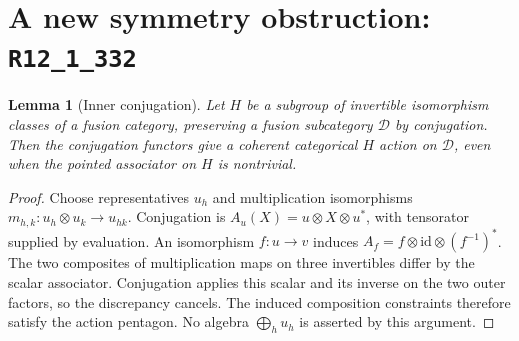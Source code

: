\documentclass[11pt]{article}
\newtheorem{lemma}[theorem]{Lemma}
\newcommand{\R}[1]{\texttt{R12\_1\_#1}}
\begin{document}
\section{A new symmetry obstruction: \R{332}}
\begin{lemma}[Inner conjugation]
Let $H$ be a subgroup of invertible isomorphism classes of a fusion
category, preserving a fusion subcategory $\mathcal D$ by conjugation.
Then the conjugation functors give a coherent categorical $H$ action on
$\mathcal D$, even when the pointed associator on $H$ is nontrivial.
\end{lemma}
\begin{proof}
Choose representatives $u_h$ and multiplication isomorphisms
$m_{h,k}:u_h\otimes u_k\to u_{hk}$. Conjugation is
$A_u(X)=u\otimes X\otimes u^*$, with tensorator supplied by evaluation.
An isomorphism $f:u\to v$ induces
$A_f=f\otimes\mathrm{id}\otimes(f^{-1})^*$.
The two composites of multiplication maps on three invertibles differ by
the scalar associator. Conjugation applies this scalar and its inverse
on the two outer factors, so the discrepancy cancels. The induced
composition constraints therefore satisfy the action pentagon.
No algebra $\bigoplus_h u_h$ is asserted by this argument.
\end{proof}
\end{document}
